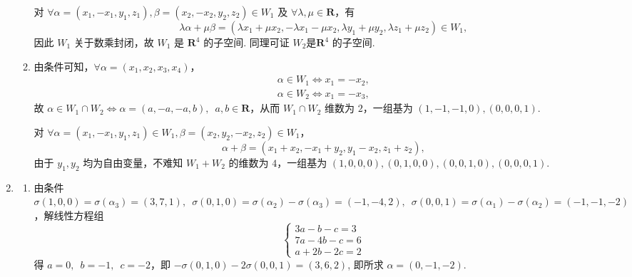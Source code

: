 \begin{enumerate}
\begin{enumerate}
        对 \(\forall \alpha=(x_1,-x_1,y_1,z_1),\beta=(x_2,-x_2,y_2,z_2) \in W_1\) 及 \(\forall \lambda,\mu\in \mathbf{R}\)，有
        \[\lambda\alpha+\mu\beta=(\lambda x_1+\mu x_2,-\lambda x_1-\mu x_2,\lambda y_1+\mu y_2,\lambda z_1+\mu z_2)\in W_1, \]
        因此 \(W_1\) 关于数乘封闭，故 \(W_1\) 是 \(\mathbf{R}^4\) 的子空间. 同理可证 \(W_2\)是\(\mathbf{R}^4\) 的子空间.

        \item 由条件可知，\(\forall \alpha=(x_1,x_2,x_3,x_4)\)，
        \begin{gather*}
            \alpha\in W_1 \iff x_1=-x_2, \\
            \alpha\in W_2 \iff x_1=-x_3,
        \end{gather*}
        故 \(\alpha\in W_1\cap W_2 \iff \alpha=(a,-a,-a,b),\enspace a,b\in \mathbf{R}\)，从而 \(W_1\cap W_2\) 维数为 \(2\)，一组基为 \((1,-1,-1,0),(0,0,0,1)\).

        对 \(\forall \alpha=(x_1,-x_1,y_1,z_1)\in W_1,\beta=(x_2,y_2,-x_2,z_2) \in W_1\)，
        \[ \alpha+\beta=(x_1+x_2,-x_1+y_2,y_1-x_2,z_1+z_2), \]
        由于 \(y_1,y_2\) 均为自由变量，不难知 \(W_1+W_2\) 的维数为 \(4\)，一组基为 \((1,0,0,0),\allowbreak(0,1,0,0),\allowbreak(0,0,1,0),\allowbreak(0,0,0,1)\).
    \end{enumerate}

    \item
    \begin{enumerate}
        \item 由条件 \(\sigma(1,0,0)=\sigma(\alpha_3)=(3,7,1),\enspace\sigma(0,1,0)=\sigma(\alpha_2)-\sigma(\alpha_3)=(-1,-4,2),\enspace\allowbreak\sigma(0,0,1)=\sigma(\alpha_1)-\sigma(\alpha_2)=(-1,-1,-2)\)，解线性方程组
        \[ \begin{cases}
            3a-b-c=3\\
            7a-4b-c=6\\
            a+2b-2c=2
        \end{cases}\]
        得 \(a=0,\enspace b=-1,\enspace c=-2\)，即 \(-\sigma(0,1,0)-2\sigma(0,0,1)=(3,6,2)\), 即所求 \(\alpha=(0,-1,-2)\).


\end{enumerate}
\end{enumerate}
